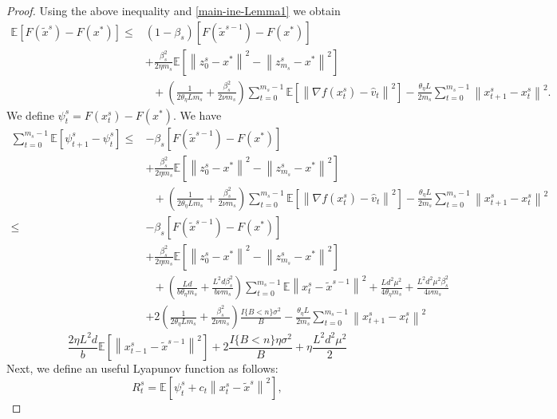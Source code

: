 \documentclass{article}
\newcommand*{\E}{\mathbb{E}}
\newcommand{\norm}[1]{\left\lVert#1\right\rVert}
\theoremstyle{definition}
\theoremstyle{remark}
\begin{document}
{\begin{proof}
Using the above inequality and \eqref{main-ine-Lemma1} we obtain
\begin{equation}
\begin{split}
\E[F(\widetilde{x}^s)-F(x^*)] \leq &(1-\beta_s)[F(\widetilde{x}^{s-1})-F(x^*)] \\
&+ {\frac{ \beta_s^2}{2\eta m_s}}\E[\norm{z_{0}^s-x^*}^2-\norm{z_{m_s}^s-x^*}^2]\\
&~~~+(\frac{1}{2\theta_{\eta} Lm_s}+\frac{\beta_s^2}{2\nu m_s})\sum_{t=0}^{m_s-1}\E\left[\norm{\nabla f(x_{t}^s)-\hat{v}_{t}}^2\right]-\frac{\theta_{\eta} L}{2m_s}\sum_{t=0}^{m_s-1}\norm{x_{t+1}^s-x_{t}^s}^2. 
\end{split}
\end{equation}
We define $\psi_t^s = F({x}^s_t)-F(x^*)$. We have
\begin{equation}
\begin{split}
\sum_{t=0}^{m_s-1}\E[\psi_{t+1}^s - \psi_t^s] \leq &-\beta_s[F(\widetilde{x}^{s-1})-F(x^*)] \\
&+ {\frac{ \beta_s^2}{2\eta m_s}}\E[\norm{z_{0}^s-x^*}^2-\norm{z_{m_s}^s-x^*}^2]\\
&~~~+(\frac{1}{2\theta_{\eta} L m_s}+\frac{\beta_s^2}{2\nu m_s})\sum_{t=0}^{m_s-1}\E\left[\norm{\nabla f(x_{t}^s)-\hat{v}_{t}}^2\right]-\frac{\theta_{\eta} L}{2m_s}\sum_{t=0}^{m_s-1}\norm{x_{t+1}^s-x_{t}^s}^2\\
\leq &-\beta_s[F(\widetilde{x}^{s-1})-F(x^*)] \\
&+ {\frac{ \beta_s^2}{2\eta m_s}}\E[\norm{z_{0}^s-x^*}^2-\norm{z_{m_s}^s-x^*}^2]\\
&~~~+(\frac{Ld}{b\theta_{\eta} m_s}+\frac{L^2d\beta_s^2}{b\nu m_s})\sum_{t=0}^{m_s-1} \E\norm{x_t^s-\widetilde{x}^{s-1}}^2+\frac{Ld^2\mu^2}{4\theta_{\eta}m_s}+\frac{ L^2d^2\mu^2\beta_s^2}{4\nu m_s}\\
&+ 2(\frac{1}{2\theta_{\eta} L m_s}+\frac{\beta_s^2}{2\nu m_s})\frac{I\{B < n\} \sigma ^2}{B}-\frac{\theta_{\eta} L}{2m_s}\sum_{t=0}^{m_s-1}\norm{x_{t+1}^s-x_{t}^s}^2
\end{split}
\end{equation}
{\color{red}
\begin{equation}
\frac{2\eta L^2 d}{b}\E\left[\norm{x_{t-1}^s-\widetilde{x}^{s-1}}^2\right]+ 2\frac{I\{B < n\}\eta \sigma ^2}{B}+\eta \frac{L^2 d^2 \mu^2}{2}
\end{equation}}
Next, we define an useful Lyapunov function as follows:
\begin{equation}
R_t^s = \E\left[\psi_{t}^s+ c_t\norm{x_t^s-\tilde{x}^s}^2\right],
\end{equation}

\end{proof}}
\end{document}
